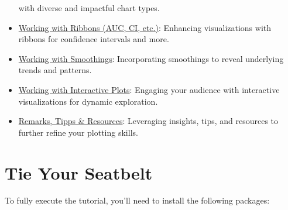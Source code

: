 \documentclass[
  letterpaper,
  DIV=11,
  numbers=noendperiod]{scrreprt}
\begin{document}
\begin{itemize}
  with diverse and impactful chart types.
\item
  \hyperref[ribbons]{Working with Ribbons (AUC, CI, etc.)}: Enhancing
  visualizations with ribbons for confidence intervals and more.
\item
  \hyperref[smooths]{Working with Smoothings}: Incorporating smoothings
  to reveal underlying trends and patterns.
\item
  \hyperref[interactive]{Working with Interactive Plots}: Engaging your
  audience with interactive visualizations for dynamic exploration.
\item
  \hyperref[tipps]{Remarks, Tipps \& Resources}: Leveraging insights,
  tips, and resources to further refine your plotting skills.
\end{itemize}


\chapter{Tie Your Seatbelt}\label{prep}

To fully execute the tutorial, you'll need to install the following
packages:
\end{document}
